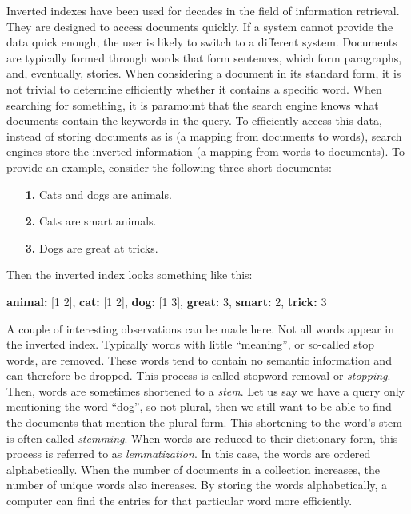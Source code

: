 Inverted indexes have been used for decades in the field of information retrieval. They are designed to access documents quickly. If a system cannot provide the data quick enough, the user is likely to switch to a different system. Documents are typically formed through words that form sentences, which form paragraphs, and, eventually, stories. When considering a document in its standard form, it is not trivial to determine efficiently whether it contains a specific word. When searching for something, it is paramount that the search engine knows what documents contain the keywords in the query. To efficiently access this data, instead of storing documents as is (a mapping from documents to words), search engines store the inverted information (a mapping from words to documents). To provide an example, consider the following three short documents:

\begin{itemize}
	\item[\textbf{1.}] Cats and dogs are animals.
	\item[\textbf{2.}] Cats are smart animals.
	\item[\textbf{3.}] Dogs are great at tricks. 
\end{itemize}
Then the inverted index looks something like this:

\medskip
\textbf{animal:} [1 2],
\textbf{cat:} [1 2], 
\textbf{dog:} [1 3],
\textbf{great:} 3,
\textbf{smart:} 2,
\textbf{trick:} 3
\medskip

\noindent A couple of interesting observations can be made here. Not all words appear in the inverted index. Typically words with little ``meaning'', or so-called stop words, are removed. These words tend to contain no semantic information and can therefore be dropped. This process is called stopword removal or \emph{stopping}. Then, words are sometimes shortened to a \emph{stem}. Let us say we have a query only mentioning the word ``dog'', so not plural, then we still want to be able to find the documents that mention the plural form.  This shortening to the word's stem is often called \emph{stemming}. When words are reduced to their dictionary form, this process is referred to as \emph{lemmatization}. In this case, the words are ordered alphabetically. When the number of documents in a collection increases, the number of unique words also increases. By storing the words alphabetically, a computer can find the entries for that particular word more efficiently. 

